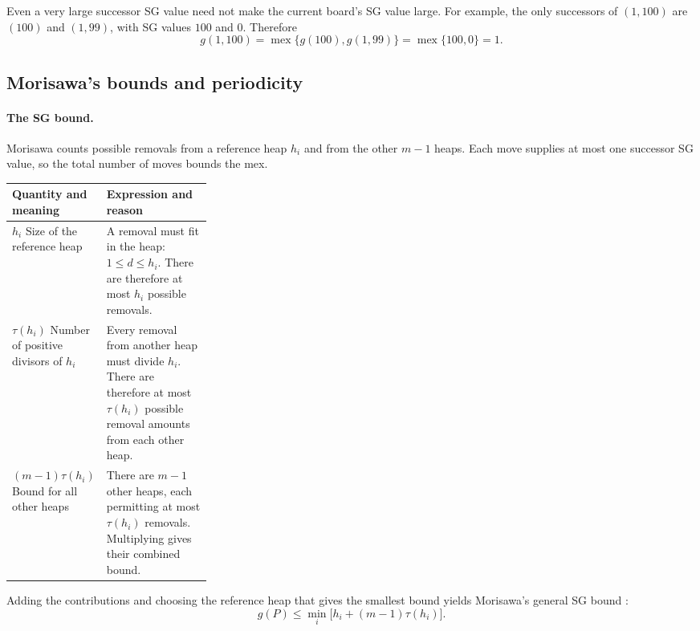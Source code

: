 \documentclass[10pt,a4paper]{article}
\DeclareMathOperator{\mex}{mex}
\begin{document}
Even a very large successor SG value need not make the current
board's SG value large. For example, the only successors of
$(1,100)$ are $(100)$ and $(1,99)$, with SG values $100$ and $0$.
Therefore
\[
 g(1,100)
 =\mex\{g(100),g(1,99)\}
 =\mex\{100,0\}
 =1.
\]

\subsection{Morisawa's bounds and periodicity}

\paragraph{The SG bound.}
Morisawa counts possible removals from a reference heap $h_i$
and from the other $m-1$ heaps. Each move supplies at most one
successor SG value, so the total number of moves bounds the mex.

\begin{center}
\begin{tabularx}{\linewidth}{@{}L{0.29\linewidth}Y@{}}
\toprule
Quantity and meaning & Expression and reason \\
\midrule
$h_i$\newline
Size of the reference heap
  & A removal must fit in the heap: $1\le d\le h_i$.
    There are therefore at most $h_i$ possible removals. \\
\addlinespace[9pt]

$\tau(h_i)$\newline
Number of positive divisors of $h_i$
  & Every removal from another heap must divide $h_i$.
    There are therefore at most $\tau(h_i)$ possible removal
    amounts from each other heap. \\
\addlinespace[9pt]

$(m-1)\tau(h_i)$\newline
Bound for all other heaps
  & There are $m-1$ other heaps, each permitting at most
    $\tau(h_i)$ removals. Multiplying gives their combined bound. \\
\bottomrule
\end{tabularx}
\end{center}

Adding the contributions and choosing the reference heap that
gives the smallest bound yields Morisawa's general SG bound
\cite[Lemma 5.2]{Morisawa2026}:
\begin{equation}
 \boxed{
 g(P)\le\min_i\bigl[h_i+(m-1)\tau(h_i)\bigr].
 }
 \label{eq:oldbound}
\end{equation}
\end{document}
